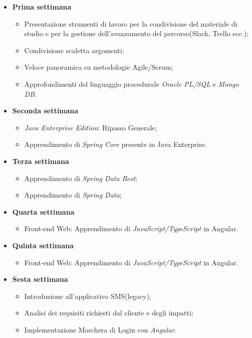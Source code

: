 \begin{itemize}
	\item \textbf{Prima settimana}
		\begin{itemize}
			\item Presentazione strumenti di lavoro per la condivisione del materiale di
			studio e per la gestione dell’avanzamento del percorso(Slack, Trello ecc.);
			\item Condivisione scaletta argomenti;
			\item Veloce panoramica su metodologie Agile/Scrum;
			\item Approfondimenti del linguaggio procedurale \textit{Oracle PL/SQL} e \textit{Mongo
			DB}.
		\end{itemize}
	\item \textbf{Seconda settimana}
		\begin{itemize}
			\item \textit{Java Enterprise Edition}: Ripasso Generale;
			\item Apprendimento di \textit{Spring Core} presente in Java Enterprise.
		\end{itemize}
	\item \textbf{Terza settimana}
		\begin{itemize}
			\item Apprendimento di \textit{Spring Data Rest};
			\item Apprendimento di \textit{Spring Data};
		\end{itemize}	
	\item \textbf{Quarta settimana}\\
		\begin{itemize}
			\item Front-end Web: Apprendimento di \textit{JavaScript/TypeScript} in Angular.
		\end{itemize}	
	\item \textbf{Quinta settimana}	
		\begin{itemize}
			\item Front-end Web: Apprendimento di \textit{JavaScript/TypeScript} in Angular.
		\end{itemize}
	\item \textbf{Sesta settimana}
		\begin{itemize}
			\item Introduzione all’applicativo SMS(legacy);
			\item Analisi dei requisiti richiesti dal cliente e degli impatti;
			\item Implementazione Maschera di Login con \textit{Angular}.

\end{itemize}
\end{itemize}
